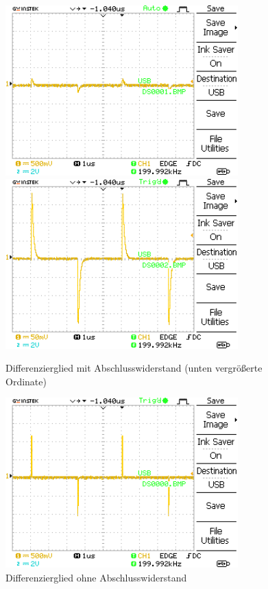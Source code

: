\documentclass{article}
\begin{document}
			
			\begin{figure}[H]
				\centering
				\includegraphics[width=0.8\textwidth]{MesswerteVersuch1/DS0001.png}
				\includegraphics[width=0.8\textwidth]{MesswerteVersuch1/DS0002.png}
				\caption{Differenzierglied mit Abschlusswiderstand (unten vergrößerte Ordinate)}
				\label{fig:DS0001,2}
			\end{figure}
			\begin{figure}[H]
				\centering
				\includegraphics[width=0.8\textwidth]{MesswerteVersuch1/DS0000.png}
				\caption{Differenzierglied ohne Abschlusswiderstand}
				\label{fig:DS0000}
			\end{figure}
			
\end{document}
